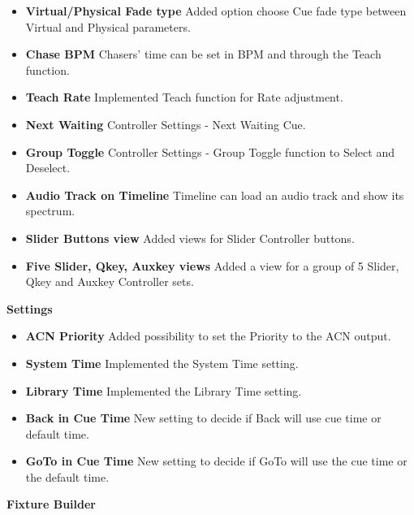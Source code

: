 \documentclass[
]{article}
\begin{document}
\begin{itemize}
\item
  \textbf{Virtual/Physical Fade type} Added option choose Cue fade type between Virtual and Physical parameters.
\item
  \textbf{Chase BPM} Chasers' time can be set in BPM and through the Teach function.
\item
  \textbf{Teach Rate} Implemented Teach function for Rate adjustment.
\item
  \textbf{Next Waiting} Controller Settings - Next Waiting Cue.
\item
  \textbf{Group Toggle} Controller Settings - Group Toggle function to Select and Deselect.
\item
  \textbf{Audio Track on Timeline} Timeline can load an audio track and show its spectrum.
\item
  \textbf{Slider Buttons view} Added views for Slider Controller buttons.
\item
  \textbf{Five Slider, Qkey, Auxkey views} Added a view for a group of 5 Slider, Qkey and Auxkey Controller sets.
\end{itemize}

\textbf{Settings}

\begin{itemize}
\item
  \textbf{ACN Priority} Added possibility to set the Priority to the ACN output.
\item
  \textbf{System Time} Implemented the System Time setting.
\item
  \textbf{Library Time} Implemented the Library Time setting.
\item
  \textbf{Back in Cue Time} New setting to decide if Back will use cue time or default time.
\item
  \textbf{GoTo in Cue Time} New setting to decide if GoTo will use the cue time or the default time.
\end{itemize}

\textbf{Fixture Builder}
\end{document}
